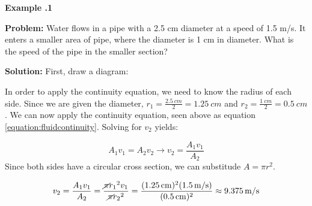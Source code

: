 	\begin{mdframed}[backgroundcolor=blue!10!white]
	\begin{center}
		
		
		\textbf{Example \thesection.1}	
	\end{center}
	
	\textbf{Problem: } Water flows in a pipe with a 2.5 cm diameter at a speed of 1.5 m/s.  It enters a smaller area of pipe, where the diameter is 1 cm in diameter.  What is the speed of the pipe in the smaller section?  
	\vspace{.1in}
	
	\textbf{Solution:} First, draw a diagram:
	
		\vspace{.1in}
		
	\vspace{0.1 in}
	
	In order to apply the continuity equation, we need to know the radius of each side.  Since we are given the diameter, $r_1 = \frac{\SI{2.5}{cm}}{2} = \SI{1.25}{cm}$ and $r_2 = \frac{\SI{1}{cm}}{2} = \SI{0.5}{cm}$.  We can now apply the continuity equation, seen above as equation \ref{equation:fluidcontinuity}.  Solving for $v_2$ yields:
	
	
	\begin{equation*}
		A_1 v_1 = A_2 v_2 \longrightarrow v_2 = \frac{A_1 v_1} {A_2}
	\end{equation*}
	Since both sides have a circular cross section, we can substitude $A=\pi r^2$.  
	
		\begin{equation*}
		v_2 = \frac{A_1 v_1} {A_2} = \frac{\cancel{\pi} {r_1}^2 v_1}{\cancel{\pi} {r_2}^2} = \frac{(\SI{1.25}{cm})^2(\SI{1.5}{m/s})}{(\SI{0.5}{cm})^2} \approx \SI{9.375}{m/s}
	\end{equation*}
	
\end{mdframed}
\vspace{0.1in}



